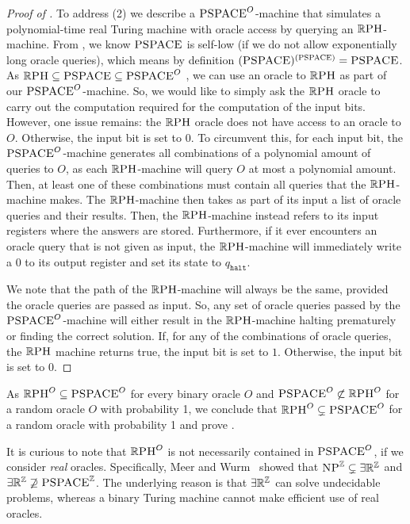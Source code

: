 \documentclass{article}
\begin{document}
\begin{proof}[Proof of ]
    To address (2) we describe a $\textsc{PSPACE}^O$-machine that simulates a polynomial-time real Turing machine with oracle access by querying an $\mathbb{R}\textsc{PH}$-machine.
    From , we know $\textsc{PSPACE}$ is self-low (if we do not allow exponentially long oracle queries), which means by definition $(\textsc{PSPACE})^{(\textsc{PSPACE})}=\textsc{PSPACE}$.
    As $\mathbb{R}\textsc{PH} \subseteq \textsc{PSPACE} \subseteq \textsc{PSPACE}^O$ \cite{Can88}, we can use an oracle to $\mathbb{R}\textsc{PH}$ as part of our $\textsc{PSPACE}^O$-machine.
    So, we would like to simply ask the $\mathbb{R}\textsc{PH}$ oracle to carry out the computation required for the computation of the input bits.
    However, one issue remains: the $\mathbb{R}\textsc{PH}$ oracle does not have access to an oracle to $O$.
    Otherwise, the input bit is set to \(0\).
    To circumvent this, for each input bit, the $\textsc{PSPACE}^O$-machine generates all combinations of a polynomial amount of queries to $O$, as each $\mathbb{R}\textsc{PH}$-machine will query $O$ at most a polynomial amount.
    Then, at least one of these combinations must contain all queries that the $\mathbb{R}\textsc{PH}$-machine makes.
    The $\mathbb{R}\textsc{PH}$-machine then takes as part of its input a list of oracle queries and their results.
    Then, the $\mathbb{R}\textsc{PH}$-machine instead refers to its input registers where the answers are stored.
    Furthermore, if it ever encounters an oracle query that is not given as input, the $\mathbb{R}\textsc{PH}$-machine will immediately write a $0$ to its output register and set its state to $q_\texttt{halt}$.

    We note that the path of the $\mathbb{R}\textsc{PH}$-machine will always be the same, provided the oracle queries are passed as input.
    So, any set of oracle queries passed by the $\textsc{PSPACE}^O$-machine will either result in the $\mathbb{R}\textsc{PH}$-machine halting prematurely or finding the correct solution.
    If, for any of the combinations of oracle queries, the $\mathbb{R}\textsc{PH}$ machine returns true, the input bit is set to \(1\).
    Otherwise, the input bit is set to \(0\).
 \end{proof}

As $\mathbb{R}\textsc{PH}^O \subseteq \textsc{PSPACE}^O$ for every binary oracle $O$ and $\textsc{PSPACE}^O \not\subset \mathbb{R}\textsc{PH}^O$ for a random oracle $O$ with probability 1, we conclude that $\mathbb{R}\textsc{PH}^O \subsetneq \textsc{PSPACE}^O$ for a random oracle with probability 1 and prove .

\begin{remark}
It is curious to note that $\mathbb{R}\textsc{PH}^O$ is not necessarily contained in $\textsc{PSPACE}^O$, if we consider \textit{real} oracles.
Specifically, Meer and Wurm~\cite{MeerWurm2025} showed that $\textsc{NP}^\mathbb{Z} \subsetneq \exists\mathbb{R}^{\mathbb{Z}}$ and 
$\exists\mathbb{R}^\mathbb{Z} \not\supseteq \textsc{PSPACE}^\mathbb{Z}$.
The underlying reason is that $\exists\mathbb{R}^\mathbb{Z}$ can solve undecidable problems, whereas a binary Turing machine cannot make efficient use of real oracles.
\end{remark}
\end{document}
